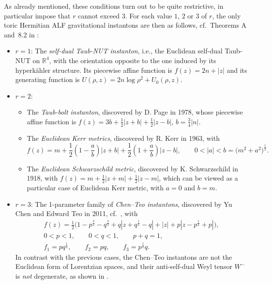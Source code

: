 \documentclass[pdftex]{sigma}
\numberwithin{equation}{section}
\begin{document}
As already mentioned, these conditions turn out to be quite restrictive, in particular impose that $r$ cannot exceed $3$. For each value $1$, $2$ or $3$ of $r$, the only toric Hermitian ALF gravitational instantons are then as follows, cf.\ Theorems A and~8.2 in \cite{BG}:
\begin{itemize}\itemsep=0pt
\item $r = 1$: The {\it self-dual Taub-NUT instanton}, i.e., the Euclidean self-dual Taub-NUT on $\mathbb{R} ^4$, with the orientation opposite to the one induced by its hyperk\"ahler structure. Its piecewise affine function is $f (z) = 2 n + |z|$ and its generating function is $U (\rho, z) = 2 n \log{\rho ^2} + U _0 (\rho, z)$.
\item $r = 2$: \begin{itemize}\itemsep=0pt
\item[(i)] The {\it Taub-bolt instanton}, discovered by D. Page in 1978, whose piecewise affine function is $f (z) = 3 b + \frac{1}{2} |z + b| + \frac{1}{2} |z - b|$, $b = \frac{3}{4} |n|$.
 \item[(ii)] The {\it Euclidean Kerr metrics}, discovered by R. Kerr in 1963, with
 \[f (z) = m + \frac{1}{2} \left(1 - \frac{a}{b}\right) |z + b| + \frac{1}{2} \left(1 + \frac{a}{b}\right) |z - b|, \qquad 0 < |a| < b = \big(m ^2 + a^2\big) ^{\frac{1}{2}}.\]
 \item[(iii)] The {\it Euclidean Schwarzschild metric}, discovered by K. Schwarzschild in 1918, with $f (z) = m + \frac{1}{2} |z + m| + \frac{1}{2} |z - m|$, which can be viewed as a particular case of Euclidean Kerr metric, with $a = 0$ and $b = m$.
\end{itemize}
 \item $r = 3$: The 1-parameter family of {\it Chen--Teo instantons}, discovered by Yu Chen and Edward Teo in 2011, cf.\ \cite{CT2}, with
 \begin{gather} f (z) = \frac{1}{2} \big(1 - p ^{\frac{3}{2}} - q ^{\frac{3}{2}} + q |z + q ^{\frac{1}{2}} - q| + |z| + p |z - p ^{\frac{1}{2}} + p|\big), \label{f-CT}\\
 0 < p < 1, \qquad 0 < q < 1, \qquad p + q = 1, \label{pq-CT} \\
 f _1 = p q ^{\frac{1}{2}}, \qquad f_2 = p q, \qquad f_3 = p^{\frac{1}{2}} q.\label{fi-CT}
 \end{gather}
 In contrast with the previous cases, the Chen--Teo instantons are not the Euclidean form of Lorentzian spaces, and their anti-self-dual Weyl tensor $W ^-$ is {\it not} degenerate, as shown in \cite{AA}.
\end{itemize}
\end{document}
